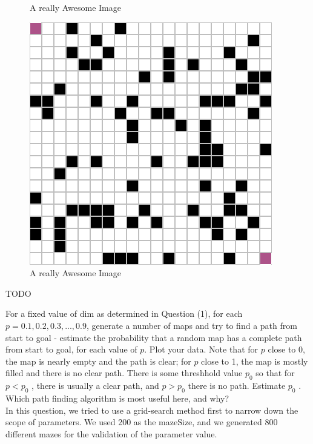 \documentclass[letter]{article}
\begin{document}
\begin{questions}
\begin{figure}
		\caption{A really Awesome Image}\label{fig:awesome_image2}
		\endminipage\hfill
		\includegraphics[width=\linewidth]{../pics/question2-1.png}
		\caption{A really Awesome Image}\label{fig:awesome_image3}
		\endminipage
	\end{figure}
	
	TODO \\
	
	
	\item {For a fixed value of dim as determined in Question (1), for each $ p = 0.1, 0.2, 0.3, ... , 0.9 $, generate a number of maps and try to find a path from start to goal - estimate the probability that a random map has a complete path from start to goal, for each value of $ p $. Plot your data. Note that for $ p $ close to 0, the map is nearly empty and the path is clear; for $ p $ close to 1, the map is mostly filled and there is no clear path. There is some threshhold value $ p_0 $ so that for $ p < p_0 $ , there is usually a clear path, and $ p > p_0 $ there is no path. Estimate $ p_0 $ . Which path finding algorithm is most useful here, and why?} \\
	
	In this question, we tried to use a grid-search method first to narrow down the scope of parameters. We used 200 as the mazeSize, and we generated 800 different mazes for the validation of the parameter value. \\
	

\end{questions}
\end{document}
